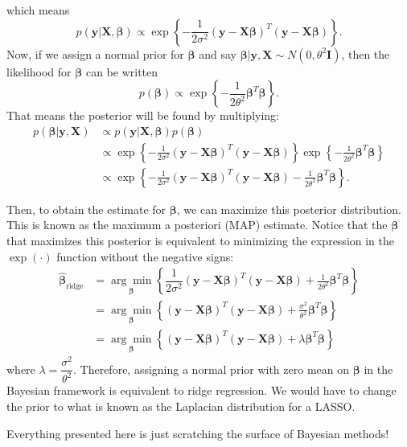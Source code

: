 \documentclass[11pt]{article}
\begin{document}
which means
$$
p(\boldsymbol{y}|\mathbf{X}, \boldsymbol{\beta})\propto \exp\left\{-\frac{1}{2\sigma^2}(\boldsymbol{y}-\mathbf{X}\boldsymbol{\beta})^T(\boldsymbol{y}-\mathbf{X}\boldsymbol{\beta}) \right\}.
$$
Now, if we assign a normal prior for $\boldsymbol{\beta}$ and say $\boldsymbol{\beta}|\boldsymbol{y}, \mathbf{X}\sim N(0, \theta^2\mathbf{I})$, then the likelihood for $\boldsymbol{\beta}$ can be written
$$
p(\boldsymbol{\beta})\propto \exp\left\{-\frac{1}{2\theta^2}\boldsymbol{\beta}^T\boldsymbol{\beta} \right\}.
$$
That means the posterior will be found by multiplying:
\begin{align*}
	p(\boldsymbol{\beta}|\boldsymbol{y}, \mathbf{X})&\propto p(\boldsymbol{y}|\mathbf{X}, \boldsymbol{\beta})p(\boldsymbol{\beta})\\
	&\propto \exp\left\{-\frac{1}{2\sigma^2}(\boldsymbol{y}-\mathbf{X}\boldsymbol{\beta})^T(\boldsymbol{y}-\mathbf{X}\boldsymbol{\beta})\right\}
	\exp\left\{-\frac{1}{2\theta^2}\boldsymbol{\beta}^T\boldsymbol{\beta} \right\}\\
	&\propto \exp\left\{-\frac{1}{2\sigma^2}(\boldsymbol{y}-\mathbf{X}\boldsymbol{\beta})^T(\boldsymbol{y}-\mathbf{X}\boldsymbol{\beta})-\frac{1}{2\theta^2}\boldsymbol{\beta}^T\boldsymbol{\beta} \right\}.
\end{align*}

Then, to obtain the estimate for $\boldsymbol{\beta}$, we can maximize this posterior distribution. This is known as the maximum a posteriori (MAP) estimate. Notice that the $\boldsymbol{\beta}$ that maximizes this posterior is equivalent to minimizing the expression in the $\exp(\cdot)$ function without the negative signs:
\begin{align*}
	\hat{\boldsymbol{\beta}}_{\text{ridge}}&=\underset{\boldsymbol{\beta}}{\arg\min}\left\{\dfrac{1}{2\sigma^2}(\boldsymbol{y}-\mathbf{X}\boldsymbol{\beta})^T(\boldsymbol{y}-\mathbf{X}\boldsymbol{\beta})+\frac{1}{2\theta^2}\boldsymbol{\beta}^T\boldsymbol{\beta}\right\}\\
	&=\underset{\boldsymbol{\beta}}{\arg\min}\left\{(\boldsymbol{y}-\mathbf{X}\boldsymbol{\beta})^T(\boldsymbol{y}-\mathbf{X}\boldsymbol{\beta})+\frac{\sigma^2}{\theta^2}\boldsymbol{\beta}^T\boldsymbol{\beta}\right\}\\
	&=\underset{\boldsymbol{\beta}}{\arg\min}\left\{(\boldsymbol{y}-\mathbf{X}\boldsymbol{\beta})^T(\boldsymbol{y}-\mathbf{X}\boldsymbol{\beta})+\lambda\boldsymbol{\beta}^T\boldsymbol{\beta}\right\}
\end{align*}
where $\lambda=\dfrac{\sigma^2}{\theta^2}$. Therefore, assigning a normal prior with zero mean on $\boldsymbol{\beta}$ in the Bayesian framework is equivalent to ridge regression. We would have to change the prior to what is known as the Laplacian distribution for a LASSO.

Everything presented here is just scratching the surface of Bayesian methods!

\end{document}
